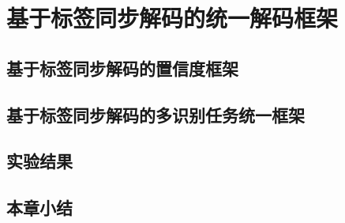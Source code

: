 
\chapter{基于标签同步解码的统一解码框架}
\label{chap:unify}
\section{基于标签同步解码的置信度框架}
\label{chap:unify-confidence}
\section{基于标签同步解码的多识别任务统一框架}
\label{chap:unify-framework}
\section{实验结果}
\label{chap:unify-exp}
\section{本章小结}
\label{chap:unify-sum}
